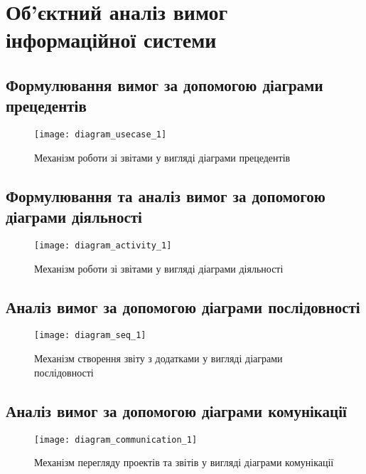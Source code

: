 \documentclass[../main.tex]{subfiles}
\begin{document}
\section{Об'єктний аналіз вимог інформаційної системи}

\subsection{Формулювання вимог за допомогою діаграми прецедентів}
\begin{figure}[H]
\centering
\texttt{[image: diagram\_usecase\_1]}
\caption{Механізм роботи зі звітами у вигляді діаграми прецедентів}
\end{figure}

\subsection{Формулювання та аналіз вимог за допомогою діаграми діяльності}
\begin{figure}[H]
\centering
\texttt{[image: diagram\_activity\_1]}
\caption{Механізм роботи зі звітами у вигляді діаграми діяльності}
\end{figure}


\subsection{Аналіз вимог за допомогою діаграми послідовності}
\begin{figure}[H]
	\centering
	\texttt{[image: diagram\_seq\_1]}
	\caption{Механізм створення звіту з додатками у вигляді діаграми послідовності}
\end{figure}

\subsection{Аналіз вимог за допомогою діаграми комунікації}
\begin{figure}[H]
	\centering
	\texttt{[image: diagram\_communication\_1]}
	\caption{Механізм перегляду проектів та звітів у вигляді діаграми комунікації}
\end{figure}

\end{document}
